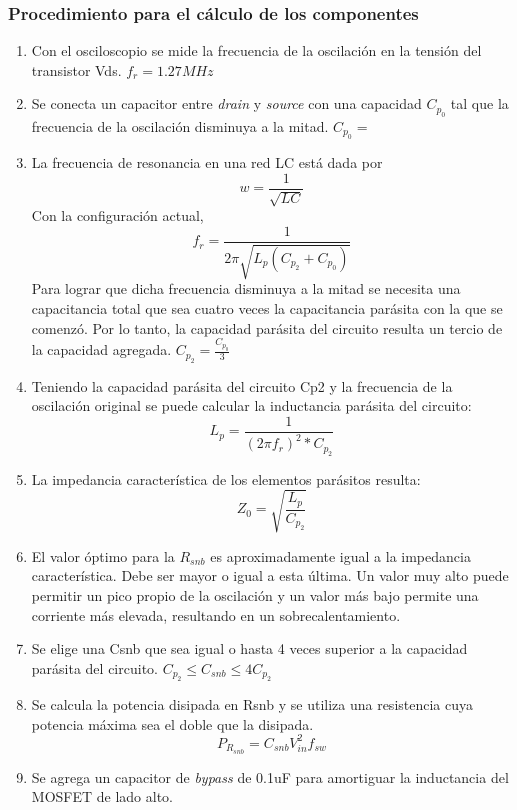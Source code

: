 \subsubsection{Procedimiento para el cálculo de los componentes}

\begin{enumerate}
    \item Con el osciloscopio se mide la frecuencia de la oscilación en la tensión del transistor Vds. $f_{r}=1.27MHz$ %
    \item Se conecta un capacitor entre \textit{drain} y \textit{source} con una capacidad $C_{p_{0}}$ tal que la frecuencia de la oscilación disminuya a la mitad. $C_{p_{0}}=$
    \item La frecuencia de resonancia en una red LC está dada por
    $$ w=\frac{1}{\sqrt{LC}} $$
    Con la configuración actual, 
    $$ f_{r}=\frac{1}{2\pi\sqrt{L_{p}(C_{p_{2}}+C_{p_{0}})}} $$
    Para lograr que dicha frecuencia disminuya a la mitad se necesita una capacitancia total que sea cuatro veces la capacitancia parásita con la que se comenzó.
    Por lo tanto, la capacidad parásita del circuito resulta un tercio de la capacidad agregada. $C_{p_{2}} = \frac{C_{p_{0}}}{3}$
    \item Teniendo la capacidad parásita del circuito Cp2 y la frecuencia de la oscilación original se puede calcular la inductancia parásita del circuito:
    $$ L_{p}=\frac{1}{(2\pi f_{r})^{2}*C_{p_{2}}} $$
    \item La impedancia característica de los elementos parásitos resulta:
    $$ Z_{0}=\sqrt{\frac{L_p}{C_{p_2}}} $$
    \item El valor óptimo para la $R_{snb}$ es aproximadamente igual a la impedancia característica. Debe ser mayor o igual a esta última. Un valor muy alto puede permitir un pico propio de la oscilación y un valor más bajo permite una corriente más elevada, resultando en un sobrecalentamiento.
    \item Se elige una Csnb que sea igual o hasta 4 veces superior a la capacidad parásita del circuito. $C_{p_2}\leq C_{snb}\leq 4C_{p_2}$
    \item Se calcula la potencia disipada en Rsnb y se utiliza una resistencia cuya potencia máxima sea el doble que la disipada.
    $$ P_{R_{snb}}=C_{snb}V_{in}^2f_{sw} $$
    \item Se agrega un capacitor de \textit{bypass} de 0.1uF para amortiguar la inductancia del MOSFET de lado alto.     
\end{enumerate}